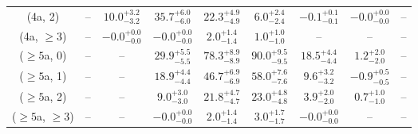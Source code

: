 \begin{table}[h!]
{\begin{tabular}{ccccccccc}
	(4a, 2) & -- & $10.0^{+ 3.2 }_{- 3.2 }$ & $35.7^{+ 6.0 }_{- 6.0 }$ & $22.3^{+ 4.9 }_{- 4.9 }$ & $6.0^{+ 2.4 }_{- 2.4 }$ & $-0.1^{+ 0.1 }_{- 0.1 }$ & $-0.0^{+ 0.0 }_{- 0.0 }$ & -- \\[0.5ex] 
	(4a, $\ge3$) & -- & $-0.0^{+ 0.0 }_{- 0.0 }$ & $-0.0^{+ 0.0 }_{- 0.0 }$ & $2.0^{+ 1.4 }_{- 1.4 }$ & $1.0^{+ 1.0 }_{- 1.0 }$ & -- & -- & -- \\[0.5ex] 
	($\ge5$a, 0) & -- & -- & $29.9^{+ 5.5 }_{- 5.5 }$ & $78.3^{+ 8.9 }_{- 8.9 }$ & $90.0^{+ 9.5 }_{- 9.5 }$ & $18.5^{+ 4.4 }_{- 4.4 }$ & $1.2^{+ 2.0 }_{- 2.0 }$ & -- \\[0.5ex] 
	($\ge5$a, 1) & -- & -- & $18.9^{+ 4.4 }_{- 4.4 }$ & $46.7^{+ 6.9 }_{- 6.9 }$ & $58.0^{+ 7.6 }_{- 7.6 }$ & $9.6^{+ 3.2 }_{- 3.2 }$ & $-0.9^{+ 0.5 }_{- 0.5 }$ & -- \\[0.5ex] 
	($\ge5$a, 2) & -- & -- & $9.0^{+ 3.0 }_{- 3.0 }$ & $21.8^{+ 4.7 }_{- 4.7 }$ & $23.0^{+ 4.8 }_{- 4.8 }$ & $3.9^{+ 2.0 }_{- 2.0 }$ & $0.7^{+ 1.0 }_{- 1.0 }$ & -- \\[0.5ex] 
	($\ge5$a, $\ge3$) & -- & -- & $-0.0^{+ 0.0 }_{- 0.0 }$ & $2.0^{+ 1.4 }_{- 1.4 }$ & $3.0^{+ 1.7 }_{- 1.7 }$ & $-0.0^{+ 0.0 }_{- 0.0 }$ & -- & -- \\[0.5ex] 
	\hline
	\hline
\end{tabular}}
\end{table}
